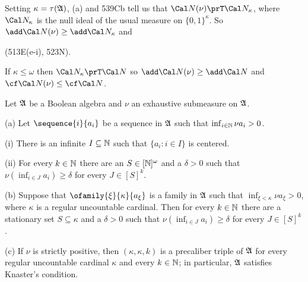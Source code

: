 {\medskip

 Setting $\kappa=\tau(\frak A)$, (a) and 539Cb tell
us that
$\Cal N(\nu)\prT\Cal N_{\kappa}$, where $\Cal N_{\kappa}$ is the null ideal
of the usual measure on $\{0,1\}^{\kappa}$.
So $\add\Cal N(\nu)\ge\add\Cal N_{\kappa}$ and


\noindent (513E(e-i), 523N).

\medskip

 If $\kappa\le\omega$ then
$\Cal N_{\kappa}\prT\Cal N$ so $\add\Cal N(\nu)\ge\add\Cal N$ and
$\cf\Cal N(\nu)\le\cf\Cal N$.
}%

 Let $\frak A$ be a Boolean algebra and $\nu$ an
exhaustive submeasure on $\frak A$.

(a) Let $\sequence{i}{a_i}$ be a
sequence in $\frak A$ such that $\inf_{i\in\Bbb N}\nu a_i>0$.

\quad (i) There is an infinite $I\subseteq\Bbb N$ such that
$\{a_i:i\in I\}$ is centered.

\quad(ii) For every $k\in\Bbb N$ there are an $S\in[\Bbb N]^{\omega}$ and
a $\delta>0$ such that
$\nu(\inf_{i\in J}a_i)\ge\delta$ for every $J\in[S]^k$.

(b) Suppose that $\ofamily{\xi}{\kappa}{a_{\xi}}$ is a
family in $\frak A$ such that $\inf_{\xi<\kappa}\nu a_{\xi}>0$,
where $\kappa$ is a regular uncountable cardinal.
Then for every $k\in\Bbb N$ there are a stationary set
$S\subseteq\kappa$ and a $\delta>0$ such that
$\nu(\inf_{i\in J}a_i)\ge\delta$ for every $J\in[S]^k$.

(c) If $\nu$ is strictly positive, then $(\kappa,\kappa,k)$ is
a precaliber triple of $\frak A$ for every regular uncountable
cardinal $\kappa$ and every $k\in\Bbb N$;  in particular, $\frak A$
satisfies Knaster's condition.

